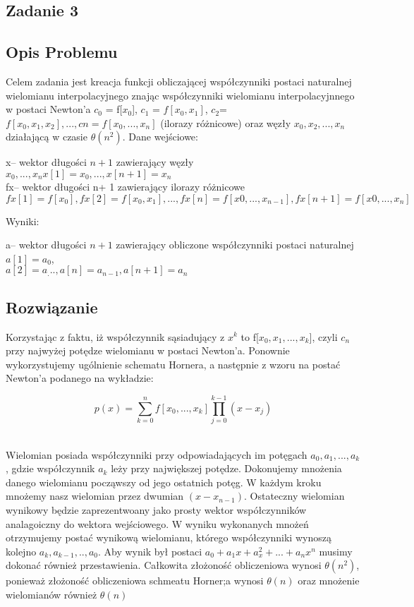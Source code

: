 \documentclass[11pt]{article}
\begin{document}
\begin{flushleft}
\section{Zadanie 3}
\subsection{Opis Problemu}
Celem zadania jest kreacja funkcji obliczającej współczynniki postaci naturalnej wielomianu interpolacyjnego znając współczynniki wielomianu interpolacyjnnego w postaci Newton'a $c_0$ = f[$x_0$], $c_1$ = $f[x_0,x_1]$, $c_2$= $f[x_0, x_1, x_2],. . .,cn=f[x_0, . . . , x_n]$ (ilorazy różnicowe) oraz węzły $ x_0, x_2, . . . , x_n $ działającą w czasie $\theta(n^2)$. Dane wejściowe:\\
\begin{center}
x– wektor długości $n+ 1 $ zawierający węzły $x_0, . . . , x_n x[1]=x_0,...,x[n+1]=x_n$ \\
fx– wektor długości n+ 1 zawierający ilorazy różnicowe $fx[1]=f[x_0],fx[2]=f[x_0, x_1],...,fx[n]=f[x0, . . . , x_{n−1}],fx[n+1]=f[x0, . . . , x_n]$\\
\begin{flushleft}
Wyniki:\\
\end{flushleft}
a– wektor długości $n+ 1 $ zawierający obliczone współczynniki postaci naturalnej\\
$a[1]=a_0$,\\
$a[2]=a_...,a[n]=a_{n−1},a[n+1]=a_n$
\end{center}
\bigskip
\subsection{Rozwiązanie}
\bigskip
Korzystając z faktu, iż współczynnik sąsiadujący z $x^k$ to f[$x_0,x_1,...,x_k$], czyli $c_n$ przy najwyżej potędze wielomianu w postaci Newton'a. Ponownie wykorzystujemy ugólnienie schematu Hornera, a następnie z wzoru na postać Newton'a podanego na  wykładzie: \\
\begin{center}
\bigskip
$$p(x) = \sum_{k=0}^n f[x_0,...,x_k] \prod^{k-1}_{j=0}(x-x_j)$$\\
\bigskip
\end{center}
Wielomian posiada współczynniki przy odpowiadających im potęgach $a_0,a_1,...,a_k$, gdzie współczynnik $a_k$ leży przy największej potędze. Dokonujemy mnożenia danego wielomianu począwszy od jego ostatnich potęg. W każdym kroku mnożemy nasz  wielomian przez dwumian $(x-x_{n-1})$. Ostateczny wielomian wynikowy będzie zaprezentwoany jako prosty wektor współczynników analagoiczny do wektora wejściowego. W wyniku wykonanych mnożeń otrzymujemy postać wynikową wielomianu, którego współczynniki wynoszą kolejno $a_k,a_{k-1},..,a_0$. Aby wynik był postaci $a_0+a_1x+a_x^2+...+a_nx^n$ musimy dokonać również przestawienia. Całkowita złożoność obliczeniowa wynosi $\theta(n^2)$, ponieważ złożoność obliczeniowa schmeatu Horner;a wynosi $\theta(n)$ oraz mnożenie wielomianów również $\theta(n)$
\newpage

\end{flushleft}
\end{document}
